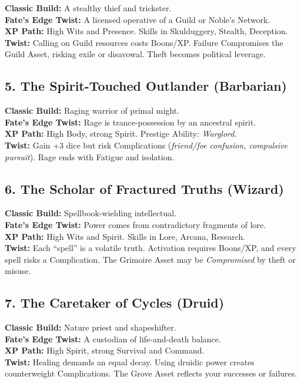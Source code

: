 \documentclass[11pt]{book}
\begin{document}
\textbf{Classic Build:} A stealthy thief and trickster.\\
\textbf{Fate’s Edge Twist:} A licensed operative of a Guild or Noble’s Network.\\
\textbf{XP Path:} High Wits and Presence. Skills in Skulduggery, Stealth, Deception.\\
\textbf{Twist:} Calling on Guild resources costs Boons/XP. Failure
Compromises the Guild Asset, risking exile or disavowal. Theft becomes political leverage.

\subsection{5. The Spirit-Touched Outlander (Barbarian)}

\textbf{Classic Build:} Raging warrior of primal might.\\
\textbf{Fate’s Edge Twist:} Rage is trance-possession by an ancestral spirit.\\
\textbf{XP Path:} High Body, strong Spirit. Prestige Ability: \emph{Warglord}.\\
\textbf{Twist:} Gain +3 dice but risk Complications
(\emph{friend/foe confusion, compulsive pursuit}). Rage ends with Fatigue and isolation.

\subsection{6. The Scholar of Fractured Truths (Wizard)}

\textbf{Classic Build:} Spellbook-wielding intellectual.\\
\textbf{Fate’s Edge Twist:} Power comes from contradictory fragments of lore.\\
\textbf{XP Path:} High Wits and Spirit. Skills in Lore, Arcana, Research.\\
\textbf{Twist:} Each “spell” is a volatile truth. Activation requires Boons/XP,
and every spell risks a Complication. The Grimoire Asset may be
\emph{Compromised} by theft or misuse.

\subsection{7. The Caretaker of Cycles (Druid)}

\textbf{Classic Build:} Nature priest and shapeshifter.\\
\textbf{Fate’s Edge Twist:} A custodian of life-and-death balance.\\
\textbf{XP Path:} High Spirit, strong Survival and Command.\\
\textbf{Twist:} Healing demands an equal decay. Using druidic power creates
counterweight Complications. The Grove Asset reflects your successes or failures.
\end{document}
